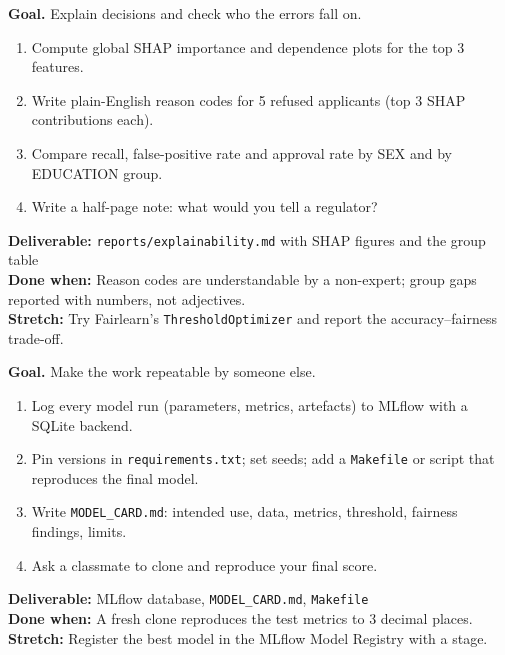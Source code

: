 \begin{tcolorbox}[enhanced,breakable,colback=white,colframe=sun,boxrule=0.8pt,arc=2pt,left=7pt,right=7pt,top=4pt,bottom=4pt,
  title={\bfseries Thursday --- Explainability and a fairness slice\hfill\normalfont\small 2--3 h},coltitle=white,colbacktitle=sun,fonttitle=\small]
\textbf{Goal.} Explain decisions and check who the errors fall on.
\begin{enumerate}[itemsep=1pt,topsep=2pt]
  \item Compute global SHAP importance and dependence plots for the top 3 features.
  \item Write plain-English reason codes for 5 refused applicants (top 3 SHAP contributions each).
  \item Compare recall, false-positive rate and approval rate by SEX and by EDUCATION group.
  \item Write a half-page note: what would you tell a regulator?
\end{enumerate}
\textbf{\color{dataC}Deliverable:} \texttt{reports/explainability.md} with SHAP figures and the group table\\
\textbf{\color{navy}Done when:} Reason codes are understandable by a non-expert; group gaps reported with numbers, not adjectives.\\
\textbf{\color{skillC}Stretch:} Try Fairlearn's \texttt{ThresholdOptimizer} and report the accuracy--fairness trade-off.
\end{tcolorbox}

\begin{tcolorbox}[enhanced,breakable,colback=white,colframe=sun,boxrule=0.8pt,arc=2pt,left=7pt,right=7pt,top=4pt,bottom=4pt,
  title={\bfseries Friday --- Experiment tracking, model card, reproducibility\hfill\normalfont\small 2 h},coltitle=white,colbacktitle=sun,fonttitle=\small]
\textbf{Goal.} Make the work repeatable by someone else.
\begin{enumerate}[itemsep=1pt,topsep=2pt]
  \item Log every model run (parameters, metrics, artefacts) to MLflow with a SQLite backend.
  \item Pin versions in \texttt{requirements.txt}; set seeds; add a \texttt{Makefile} or script that reproduces the final model.
  \item Write \texttt{MODEL\_CARD.md}: intended use, data, metrics, threshold, fairness findings, limits.
  \item Ask a classmate to clone and reproduce your final score.
\end{enumerate}
\textbf{\color{dataC}Deliverable:} MLflow database, \texttt{MODEL\_CARD.md}, \texttt{Makefile}\\
\textbf{\color{navy}Done when:} A fresh clone reproduces the test metrics to 3 decimal places.\\
\textbf{\color{skillC}Stretch:} Register the best model in the MLflow Model Registry with a stage.
\end{tcolorbox}

